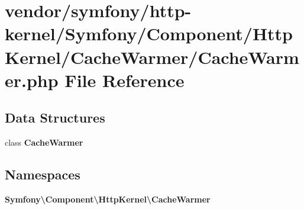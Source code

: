 \section{vendor/symfony/http-\/kernel/\+Symfony/\+Component/\+Http\+Kernel/\+Cache\+Warmer/\+Cache\+Warmer.php File Reference}
\label{_cache_warmer_8php}
\subsection*{Data Structures}
\begin{DoxyCompactItemize}
\item 
class {\bf Cache\+Warmer}
\end{DoxyCompactItemize}
\subsection*{Namespaces}
\begin{DoxyCompactItemize}
\item 
 {\bf Symfony\textbackslash{}\+Component\textbackslash{}\+Http\+Kernel\textbackslash{}\+Cache\+Warmer}
\end{DoxyCompactItemize}
